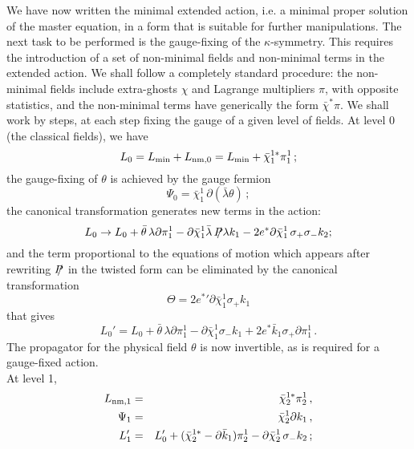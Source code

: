 \documentclass[a4paper,12pt]{article}
\begin{document}
We have now written the minimal extended action, i.e. a minimal proper
solution of the master equation, in a form that is suitable for
further manipulations.  The next task to be performed is the
gauge-fixing of the $\kappa$-symmetry. This requires the introduction
of a set of non-minimal fields and non-minimal terms in the extended
action. We shall follow a completely standard procedure: the
non-minimal fields include extra-ghosts $\chi$ and Lagrange
multipliers $\pi$, with opposite statistics, and the non-minimal terms
have generically the form $\bar\chi^* \pi$.  We shall work by steps,
at each step fixing the gauge of a given level of fields.  At level
$0$ (the classical fields), we have
\begin{equation}
  L_0 = L_{\rm min} + L_{\rm nm,0} = L_{\rm min} + {\bar\chi}_1^{1*} \pi_1^1 \, ;
\end{equation}
the gauge-fixing of $\theta$ is achieved by the gauge fermion
\begin{equation}
  \Psi_0 = \bar\chi_1^1 \, \partial(\bar\lambda \theta) \,;
\end{equation}
the canonical transformation generates new terms in the action:
\begin{equation}
  L_0 \to L_0 + \bar\theta \, \lambda \partial\pi_1^1 -
  \partial\bar\chi_1^1 \bar\lambda \, \SL{P} \lambda
  k_1 - 2 e^* \partial \bar\chi_1^1 \, \sigma_+ \sigma_- k_2 ; 
\end{equation}
and the term proportional to the equations of motion which appears
after rewriting $\SL{P}$ in the twisted form can be eliminated by the
canonical transformation
\begin{equation}
  \Theta = 2 {e^*}' \partial \bar\chi_1^1 \sigma_+ k_1
\end{equation}
that gives
\begin{equation}
  L_0' =   L_0 + \bar\theta \, \lambda \partial\pi_1^1 -
  \partial\bar\chi_1^1 \sigma_-
  k_1 + 2 e^* \bar k_1 \sigma_+ \partial \pi_1^1 \,  .
\end{equation}
The propagator for the physical field $\theta$ is now invertible, as
is required for a gauge-fixed action. \\
At level 1, 
\begin{eqnarray}
  L_{\rm nm,1} &=&  {\bar\chi}_2^{1*} \pi_2^1 \, , \nonumber \\
  \Psi_1 &=& \bar\chi_2^1 \partial k_1 \, ,  \\
  L_1'  &=& L_0' + ({\bar\chi}_2^{1*} - \partial \bar k_1) \pi_2^1 - \partial
  \bar\chi_2^1 \, \sigma_- k_2 \, ; \nonumber
\end{eqnarray}
\end{document}
